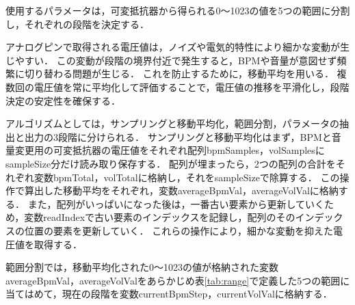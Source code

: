 \documentclass[lualatex,book,paper=a4paper,jafontsize=11.5pt,jafontscale=1.05]{jlreq}
\begin{document}
使用するパラメータは，可変抵抗器から得られる0〜1023の値を5つの範囲に分割し，それぞれの段階を決定する．

アナログピンで取得される電圧値は，ノイズや電気的特性により細かな変動が生じやすい．
この変動が段階の境界付近で発生すると，BPMや音量が意図せず頻繁に切り替わる問題が生じる．
これを防止するために，移動平均を用いる．
複数回の電圧値を常に平均化して評価することで，電圧値の推移を平滑化し，段階決定の安定性を確保する．

アルゴリズムとしては，サンプリングと移動平均化，範囲分割，パラメータの抽出と出力の3段階に分けられる．
サンプリングと移動平均化はまず，BPMと音量変更用の可変抵抗器の電圧値をそれぞれ配列bpmSamples，volSamplesにsampleSize分だけ読み取り保存する．
配列が埋まったら，2つの配列の合計をそれぞれ変数bpmTotal，volTotalに格納し，それをsampleSizeで除算する．
この操作で算出した移動平均をそれぞれ，変数averageBpmVal，averageVolValに格納する．
また，配列がいっぱいになった後は，一番古い要素から更新していくため，変数readIndexで古い要素のインデックスを記録し，配列のそのインデックスの位置の要素を更新していく．
これらの操作により，細かな変動を抑えた電圧値を取得する．


範囲分割では，移動平均化された0〜1023の値が格納された変数averageBpmVal，averageVolValをあらかじめ表\ref{tab:range}で定義した5つの範囲に当てはめて，現在の段階を変数currentBpmStep，currentVolValに格納する．
\end{document}
